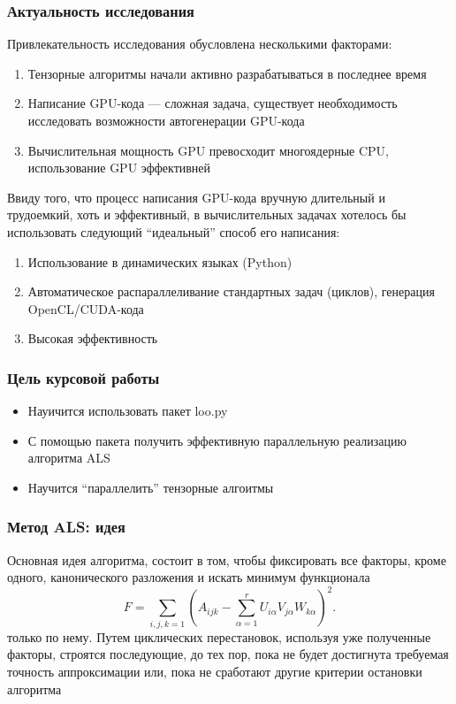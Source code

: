 \documentclass[presentation]{beamer}
\begin{document}
\begin{frame}
\frametitle{Актуальность исследования}
\label{sec-1-10}

Привлекательность исследования обусловлена несколькими факторами:
\begin{enumerate}
\item Тензорные алгоритмы начали активно разрабатываться в последнее время
\item Написание GPU-кода --- сложная задача, существует необходимость исследовать возможности автогенерации GPU-кода
\item Вычислительная мощность GPU превосходит многоядерные CPU, использование GPU эффективней
\end{enumerate}
\end{frame}
\begin{frame}

Ввиду того, что процесс написания GPU-кода вручную длительный и трудоемкий, хоть и эффективный,
 в вычислительных задачах хотелось бы использовать следующий ``идеальный'' способ его написания:
\begin{enumerate}
\item Использование в динамических языках (Python)
\item Автоматическое распараллеливание стандартных задач (циклов), генерация OpenCL/CUDA-кода
\item Высокая эффективность
\end{enumerate}
\end{frame}
\begin{frame}
\frametitle{Цель курсовой работы}
\label{sec-1-12}

\begin{itemize}
\item Науичится использовать пакет loo.py
\item С помощью пакета получить эффективную параллельную реализацию алгоритма ALS
\item Научится ``параллелить'' тензорные алгоитмы
\end{itemize}
\end{frame}
\begin{frame}
\frametitle{Метод ALS: идея}
\label{sec-1-13}


Основная идея алгоритма, состоит в том, чтобы фиксировать все факторы,
кроме одного, канонического разложения и искать минимум функционала 
\begin{equation*}
F=\sum_{i,j,k=1} (A_{ijk}-\sum_{\alpha=1}^r U_{i\alpha}V_{j\alpha}W_{k\alpha})^2.
\end{equation*}
только по нему.
Путем циклических перестановок, используя уже полученные факторы, строятся последующие, до тех пор,
пока не будет достигнута требуемая точность аппроксимации или, пока не сработают другие критерии
остановки алгоритма
\end{frame}
\end{document}
